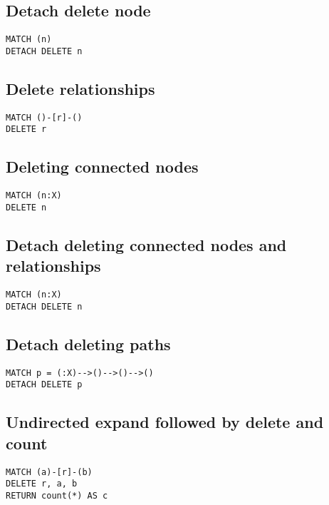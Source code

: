 \subsection{Detach delete node}

\begin{lstlisting}
MATCH (n)
DETACH DELETE n
\end{lstlisting}

\subsection{Delete relationships}

\begin{lstlisting}
MATCH ()-[r]-()
DELETE r
\end{lstlisting}

\subsection{Deleting connected nodes}

\begin{lstlisting}
MATCH (n:X)
DELETE n
\end{lstlisting}

\subsection{Detach deleting connected nodes and relationships}

\begin{lstlisting}
MATCH (n:X)
DETACH DELETE n
\end{lstlisting}

\subsection{Detach deleting paths}

\begin{lstlisting}
MATCH p = (:X)-->()-->()-->()
DETACH DELETE p
\end{lstlisting}

\subsection{Undirected expand followed by delete and count}

\begin{lstlisting}
MATCH (a)-[r]-(b)
DELETE r, a, b
RETURN count(*) AS c
\end{lstlisting}

